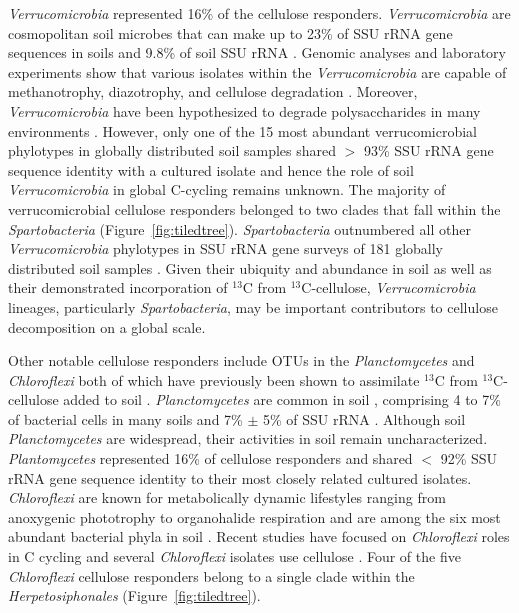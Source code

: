 \textit{Verrucomicrobia} represented 16\% of the cellulose responders.
\textit{Verrucomicrobia} are cosmopolitan soil microbes \citep{Bergmann_2011}
that can make up to 23\% of SSU rRNA gene sequences in soils
\citep{Bergmann_2011} and 9.8\% of soil SSU rRNA \citep{Buckley_2001}. Genomic
analyses and laboratory experiments show that various isolates within the
\textit{Verrucomicrobia} are capable of methanotrophy, diazotrophy, and
cellulose degradation \citep{Wertz_2011,Otsuka_2012}. Moreover,
\textit{Verrucomicrobia} have been hypothesized to degrade polysaccharides in
many environments \citep{Fierer_2013,10543821,Herlemann_2013}. However, only
one of the 15 most abundant verrucomicrobial phylotypes in globally distributed
soil samples shared $>$ 93\% SSU rRNA gene sequence identity with a cultured
isolate \citep{Bergmann_2011} and hence the role of soil
\textit{Verrucomicrobia} in global C-cycling remains unknown. The majority of
verrucomicrobial cellulose responders belonged to two clades that fall within
the \textit{Spartobacteria} (Figure~\ref{fig:tiledtree}).
\textit{Spartobacteria} outnumbered all other \textit{Verrucomicrobia}
phylotypes in SSU rRNA gene surveys of
181 globally distributed soil samples \citep{Bergmann_2011}. Given their ubiquity and abundance
in soil as well as their demonstrated incorporation of $^{13}$C from
$^{13}$C-cellulose, \textit{Verrucomicrobia} lineages, particularly
\textit{Spartobacteria}, may be important contributors to cellulose
decomposition on a global scale. 

Other notable cellulose responders include OTUs in the \textit{Planctomycetes}
and \textit{Chloroflexi} both of which have previously been shown to
assimilate $^{13}$C from $^{13}$C-cellulose added to soil
\citep{Schellenberger_2010}. \textit{Planctomycetes} are common in soil
\citep{Janssen2006}, comprising 4 to 7\% of bacterial cells in many soils
\citep{Zarda_1997,Chatzinotas_1998} and 7\% $\pm$ 5\% of SSU rRNA
\citep{buckley_2003}. Although soil \textit{Planctomycetes} are widespread,
their activities in soil remain uncharacterized. \textit{Plantomycetes}
represented 16\% of cellulose responders and shared $<$ 92\% SSU rRNA gene
sequence identity to their most closely related cultured isolates.
\textit{Chloroflexi} are known for metabolically dynamic lifestyles ranging
from anoxygenic phototrophy to organohalide respiration \citep{Hug_2013} and
are among the six most abundant bacterial phyla in soil \citep{Janssen2006}.
Recent studies have focused on \textit{Chloroflexi} roles in C cycling
\citep{Hug_2013,Goldfarb_2011,Cole_2013} and several \textit{Chloroflexi}
isolates use cellulose \citep{Hug_2013,Goldfarb_2011,Cole_2013}. Four of the
five \textit{Chloroflexi} cellulose responders belong to a single clade within
the \textit{Herpetosiphonales} (Figure~\ref{fig:tiledtree}). 

